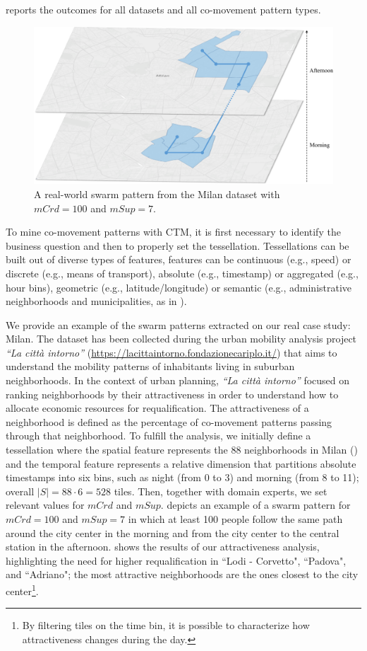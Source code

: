 \documentclass[preprint,12pt,authoryear]{elsarticle} %
\renewcommand{\sf}[1]{\textsf{\textup{#1}}}
\begin{document}
 reports the outcomes for all datasets and all co-movement pattern types.
\begin{figure}[t]
    \centering
    \includegraphics[scale=.3]{qualitativeswarm.pdf}
    \caption{A real-world swarm pattern from the \sf{Milan} dataset with $mCrd=100$ and $mSup=7$.}
    \label{fig:qualitativeswarm}
\end{figure}
%
To mine co-movement patterns with CTM, it is first necessary to identify the business question and then to properly set the tessellation. 
Tessellations can be built out of diverse types of features, features can be continuous (e.g., speed) or discrete (e.g., means of transport), absolute (e.g., timestamp) or aggregated (e.g., hour bins), geometric (e.g., latitude/longitude) or semantic (e.g., administrative neighborhoods and municipalities, as in ).

We provide an example of the swarm patterns extracted on our real case study: \sf{Milan}.
The dataset has been collected during the urban mobility analysis project \textit{``La città intorno''} (\url{https://lacittaintorno.fondazionecariplo.it/}) that aims to understand the mobility patterns of inhabitants living in suburban neighborhoods.
In the context of urban planning, \textit{``La città intorno''} focused on ranking neighborhoods by their attractiveness in order to understand how to allocate economic resources for requalification.
The attractiveness of a neighborhood is defined as the percentage of co-movement patterns passing through that neighborhood.
To fulfill the analysis, we initially define a tessellation where the spatial feature represents the 88 neighborhoods in Milan () and the temporal feature represents a relative dimension that partitions absolute timestamps into six bins, such as night (from 0 to 3) and morning (from 8 to 11); overall $|S| = 88 \cdot 6 = 528$ tiles.
Then, together with domain experts, we set relevant values for $mCrd$ and $mSup$.  depicts an example of a swarm pattern for $mCrd=100$ and $mSup=7$ in which at least 100 people follow the same path around the city center in the morning and from the city center to the central station in the afternoon.
 shows the results of our attractiveness analysis, highlighting the need for higher requalification in ``Lodi - Corvetto", ``Padova", and ``Adriano"; the most attractive neighborhoods are the ones closest to the city center\footnote{By filtering tiles on the time bin, it is possible to characterize how attractiveness changes during the day.}.
\end{document}
